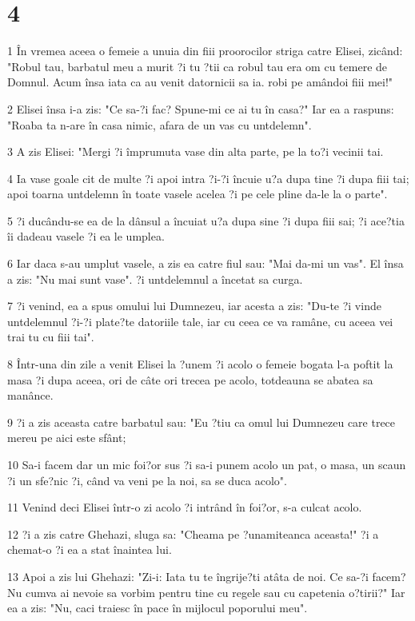 \chapter{4}

\par 1 În vremea aceea o femeie a unuia din fiii proorocilor striga catre Elisei, zicând: "Robul tau, barbatul meu a murit ?i tu ?tii ca robul tau era om cu temere de Domnul. Acum însa iata ca au venit datornicii sa ia. robi pe amândoi fiii mei!"
\par 2 Elisei însa i-a zis: "Ce sa-?i fac? Spune-mi ce ai tu în casa?" Iar ea a raspuns: "Roaba ta n-are în casa nimic, afara de un vas cu untdelemn".
\par 3 A zis Elisei: "Mergi ?i împrumuta vase din alta parte, pe la to?i vecinii tai.
\par 4 Ia vase goale cit de multe ?i apoi intra ?i-?i încuie u?a dupa tine ?i dupa fiii tai; apoi toarna untdelemn în toate vasele acelea ?i pe cele pline da-le la o parte".
\par 5 ?i ducându-se ea de la dânsul a încuiat u?a dupa sine ?i dupa fiii sai; ?i ace?tia îi dadeau vasele ?i ea le umplea.
\par 6 Iar daca s-au umplut vasele, a zis ea catre fiul sau: "Mai da-mi un vas". El însa a zis: "Nu mai sunt vase". ?i untdelemnul a încetat sa curga.
\par 7 ?i venind, ea a spus omului lui Dumnezeu, iar acesta a zis: "Du-te ?i vinde untdelemnul ?i-?i plate?te datoriile tale, iar cu ceea ce va ramâne, cu aceea vei trai tu cu fiii tai".
\par 8 Într-una din zile a venit Elisei la ?unem ?i acolo o femeie bogata l-a poftit la masa ?i dupa aceea, ori de câte ori trecea pe acolo, totdeauna se abatea sa manânce.
\par 9 ?i a zis aceasta catre barbatul sau: "Eu ?tiu ca omul lui Dumnezeu care trece mereu pe aici este sfânt;
\par 10 Sa-i facem dar un mic foi?or sus ?i sa-i punem acolo un pat, o masa, un scaun ?i un sfe?nic ?i, când va veni pe la noi, sa se duca acolo".
\par 11 Venind deci Elisei într-o zi acolo ?i intrând în foi?or, s-a culcat acolo.
\par 12 ?i a zis catre Ghehazi, sluga sa: "Cheama pe ?unamiteanca aceasta!" ?i a chemat-o ?i ea a stat înaintea lui.
\par 13 Apoi a zis lui Ghehazi: "Zi-i: Iata tu te îngrije?ti atâta de noi. Ce sa-?i facem? Nu cumva ai nevoie sa vorbim pentru tine cu regele sau cu capetenia o?tirii?" Iar ea a zis: "Nu, caci traiesc în pace în mijlocul poporului meu".
